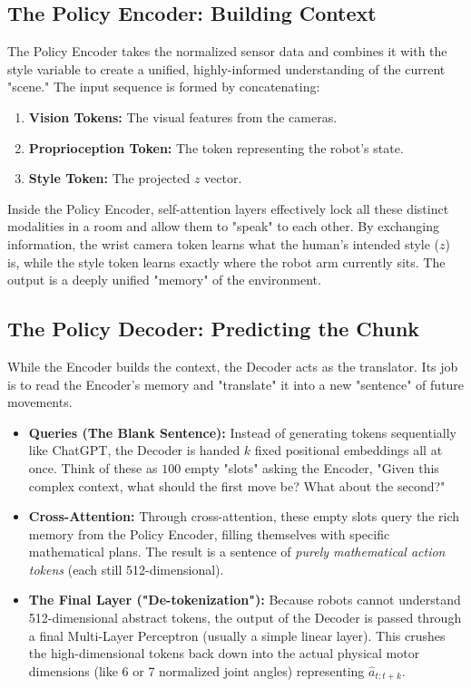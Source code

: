 \documentclass[11pt,a4paper]{article}
\begin{document}
\subsection{The Policy Encoder: Building Context}
The Policy Encoder takes the normalized sensor data and combines it with the style variable to create a unified, highly-informed understanding of the current "scene." The input sequence is formed by concatenating:
\begin{enumerate}
    \item \textbf{Vision Tokens:} The visual features from the cameras.
    \item \textbf{Proprioception Token:} The token representing the robot's state.
    \item \textbf{Style Token:} The projected $z$ vector.
\end{enumerate}

Inside the Policy Encoder, self-attention layers effectively lock all these distinct modalities in a room and allow them to "speak" to each other. By exchanging information, the wrist camera token learns what the human's intended style ($z$) is, while the style token learns exactly where the robot arm currently sits. The output is a deeply unified "memory" of the environment.

\subsection{The Policy Decoder: Predicting the Chunk}
While the Encoder builds the context, the Decoder acts as the translator. Its job is to read the Encoder's memory and "translate" it into a new "sentence" of future movements.
\begin{itemize}
    \item \textbf{Queries (The Blank Sentence):} Instead of generating tokens sequentially like ChatGPT, the Decoder is handed $k$ fixed positional embeddings all at once. Think of these as $100$ empty "slots" asking the Encoder, "Given this complex context, what should the first move be? What about the second?"
    \item \textbf{Cross-Attention:} Through cross-attention, these empty slots query the rich memory from the Policy Encoder, filling themselves with specific mathematical plans. The result is a sentence of \textit{purely mathematical action tokens} (each still 512-dimensional).
    \item \textbf{The Final Layer ("De-tokenization"):} Because robots cannot understand 512-dimensional abstract tokens, the output of the Decoder is passed through a final Multi-Layer Perceptron (usually a simple linear layer). This crushes the high-dimensional tokens back down into the actual physical motor dimensions (like 6 or 7 normalized joint angles) representing $\hat{a}_{t:t+k}$.
\end{itemize}
\end{document}
